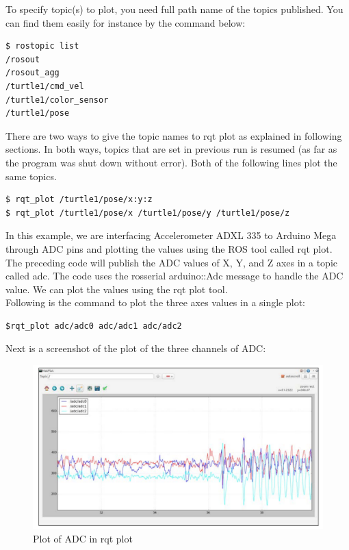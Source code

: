 To specify topic(s) to plot, you need full path name of the topics published. You can find them easily for instance by the command below:
\begin{lstlisting}[language=terCmd]
$ rostopic list
/rosout        
/rosout_agg
/turtle1/cmd_vel
/turtle1/color_sensor
/turtle1/pose
\end{lstlisting}
There are two ways to give the topic names to rqt plot as explained in following sections. In both ways, topics that are set in previous run is resumed (as far as the program was shut down without error).
Both of the following lines plot the same topics.
\begin{lstlisting}[language=terCmd]
$ rqt_plot /turtle1/pose/x:y:z
$ rqt_plot /turtle1/pose/x /turtle1/pose/y /turtle1/pose/z
\end{lstlisting}
In this example, we are interfacing Accelerometer ADXL 335 to Arduino Mega through ADC pins and plotting the values using the ROS tool called rqt plot.
The preceding code will publish the ADC values of X, Y, and Z axes in a topic called adc. The code uses the rosserial arduino::Adc message to handle the ADC value. We can plot the values using the rqt plot tool.\\

Following is the command to plot the three axes values in a single plot:
\begin{lstlisting}[language=terCmd] 
$rqt_plot adc/adc0 adc/adc1 adc/adc2
\end{lstlisting}
Next is a screenshot of the plot of the three channels of ADC:
\begin{figure}[H]
	\centering
	\includegraphics[width =.8\textwidth]{figures/ADC}
	\caption{Plot of ADC in rqt plot}
	\label{Fig:ADC}
\end{figure}